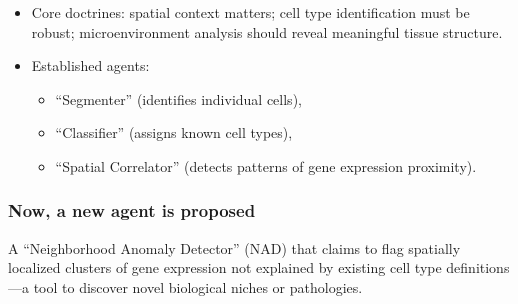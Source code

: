 \begin{itemize}

  \item Core doctrines: spatial context matters; cell type identification must
    be robust; microenvironment analysis should reveal meaningful tissue
    structure.

  \item Established agents:

  \begin{itemize}

    \item “Segmenter” (identifies individual cells),

    \item “Classifier” (assigns known cell types),

    \item “Spatial Correlator” (detects patterns of gene expression proximity).

  \end{itemize}

\end{itemize}

\subsubsection*{Now, a new agent is proposed}

A “Neighborhood Anomaly Detector” (NAD) that claims to flag spatially localized
clusters of gene expression not explained by existing cell type definitions—a
tool to discover novel biological niches or pathologies.


